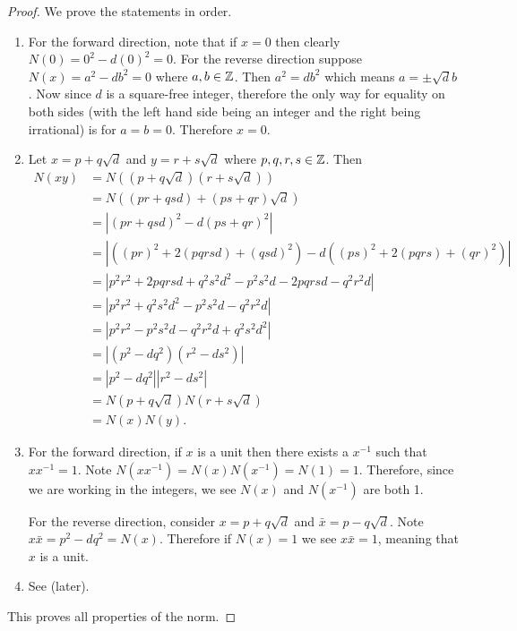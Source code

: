 \begin{proof}
    We prove the statements in order.
    \begin{enumerate}
        \item For the forward direction, note that if $x = 0$ then clearly $N(0) = 0^2 - d(0)^2 = 0$. For the reverse direction suppose $N(x) = a^2 - db^2 = 0$ where $a,b \in \mathbb{Z}$. Then $a^2 = db^2$ which means $a = \pm\sqrt{d}b$. Now since $d$ is a square-free integer, therefore the only way for equality on both sides (with the left hand side being an integer and the right being irrational) is for $a = b = 0$. Therefore $x = 0$.
        
        \item Let $x = p + q\sqrt{d}$ and $y = r + s\sqrt{d}$ where $p,q,r,s \in \mathbb{Z}$. Then
        \begin{align*}
            N(xy) &= N((p+q\sqrt{d})(r+s\sqrt{d}))\\
            &= N((pr + qsd) + (ps + qr)\sqrt{d})\\
            &= |(pr+qsd)^2 - d(ps+qr)^2|\\
            &= |((pr)^2 + 2(pqrsd) + (qsd)^2) - d((ps)^2 + 2(pqrs) + (qr)^2)|\\
            &= |p^2r^2 + 2pqrsd + q^2s^2d^2 - p^2s^2d - 2pqrsd - q^2r^2d|\\
            &= |p^2r^2 + q^2s^2d^2 - p^2s^2d - q^2r^2d|\\
            &= |p^2r^2 - p^2s^2d - q^2r^2d + q^2s^2d^2|\\
            &= |(p^2 - dq^2)(r^2 - ds^2)|\\
            &= |p^2 - dq^2||r^2 - ds^2|\\
            &= N(p+q\sqrt{d})N(r+s\sqrt{d})\\
            &= N(x)N(y).
        \end{align*}

        \item For the forward direction, if $x$ is a unit then there exists a $x^{-1}$ such that $xx^{-1} = 1$. Note $N(xx^{-1}) = N(x)N(x^{-1}) = N(1) = 1$. Therefore, since we are working in the integers, we see $N(x)$ and $N(x^{-1})$ are both 1.
        
        For the reverse direction, consider $x = p+q\sqrt{d}$ and $\bar{x} = p-q\sqrt{d}$. Note $x\bar{x} = p^2-dq^2 = N(x)$. Therefore if $N(x) = 1$ we see $x\bar{x} = 1$, meaning that $x$ is a unit.

        \item See  (later).
    \end{enumerate}
    This proves all properties of the norm.
\end{proof}

